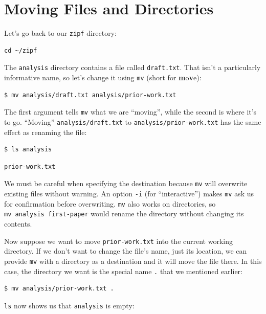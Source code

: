 \documentclass[
]{krantz}
\begin{document}
\hypertarget{bash-basics-move}{%
\section{Moving Files and Directories}\label{bash-basics-move}}

Let's go back to our \texttt{zipf} directory:

\begin{verbatim}
cd ~/zipf
\end{verbatim}

The \texttt{analysis} directory contains a file called \texttt{draft.txt}.
That isn't a particularly informative name,
so let's change it using \texttt{mv} (short for \textbf{m}o\textbf{v}e):

\begin{verbatim}
$ mv analysis/draft.txt analysis/prior-work.txt
\end{verbatim}

The first argument tells \texttt{mv} what we are ``moving'',
while the second is where it's to go.
``Moving'' \texttt{analysis/draft.txt} to \texttt{analysis/prior-work.txt}
has the same effect as renaming the file:

\begin{verbatim}
$ ls analysis
\end{verbatim}

\begin{verbatim}
prior-work.txt
\end{verbatim}

We must be careful when specifying the destination
because \texttt{mv} will overwrite existing files without warning.
An option \texttt{-i} (for ``interactive'') makes \texttt{mv} ask us for confirmation before overwriting.
\texttt{mv} also works on directories,
so \texttt{mv\ analysis\ first-paper} would rename the directory without changing its contents.

Now suppose we want to move \texttt{prior-work.txt} into the current working directory.
If we don't want to change the file's name,
just its location,
we can provide \texttt{mv} with a directory as a destination
and it will move the file there.
In this case,
the directory we want is the special name \texttt{.} that we mentioned earlier:

\begin{verbatim}
$ mv analysis/prior-work.txt .
\end{verbatim}

\texttt{ls} now shows us that \texttt{analysis} is empty:
\end{document}
